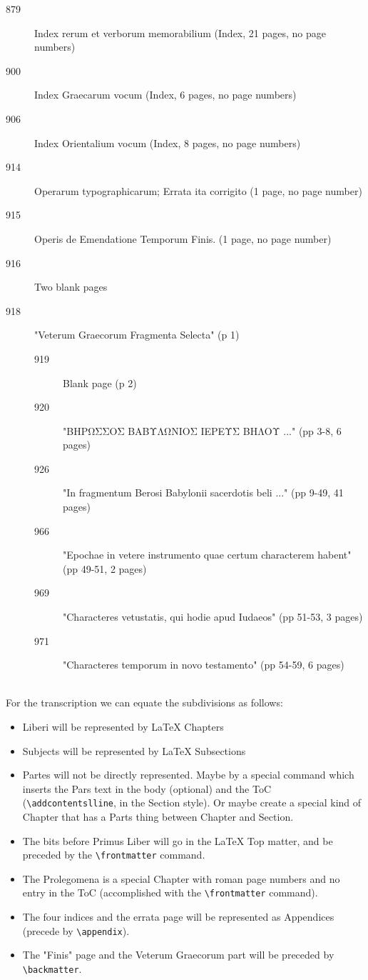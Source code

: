 \documentclass{report}
\begin{document}
\begin{description}
\item[879] Index rerum et verborum memorabilium
 (Index, 21 pages, no page numbers)
\item[900] Index Graecarum vocum (Index, 6 pages, no page numbers)
\item[906] Index Orientalium vocum (Index,  8 pages, no page numbers)
\item[914] Operarum typographicarum; Errata ita corrigito
 (1 page, no page number)
\item[915] Operis de Emendatione Temporum Finis. (1 page, no page number)
\item[916] Two blank pages
\item[918] "Veterum Graecorum Fragmenta Selecta" (p 1)
\begin{description}
  \item[919] Blank page (p 2)
  \item[920] "ΒΗΡΩΣΣΟΣ ΒΑΒΥΛΩΝΙΟΣ ΙΕΡΕΥΣ ΒΗΛΟΥ ..."
     (pp 3-8, 6 pages)
  \item[926] "In fragmentum Berosi Babylonii sacerdotis beli ..."
     (pp 9-49, 41 pages)
  \item[966] "Epochae in vetere instrumento quae certum characterem habent"
     (pp 49-51, 2 pages)
  \item[969] "Characteres vetustatis, qui hodie apud Iudaeos"
     (pp 51-53, 3 pages)
  \item[971] "Characteres temporum in novo testamento"
     (pp 54-59, 6 pages)
\end{description}
\end{description}
~
\\
For the transcription we can equate the subdivisions as follows:
\begin{itemize}
\item Liberi will be represented by LaTeX Chapters
\item Subjects will be represented by LaTeX Subsections
\item Partes will not be directly represented. Maybe by a special command
 which inserts the Pars text in the body (optional) and the ToC
 (\verb+\addcontentslline+, in the Section style). Or maybe create a special
  kind of Chapter that has a Parts thing between Chapter and Section.
\item The bits before Primus Liber will go in the LaTeX Top matter, and be
 preceded by the \verb+\frontmatter+ command.
\item The Prolegomena is a special Chapter with roman page numbers and
 no entry in the ToC (accomplished with the \verb+\frontmatter+ command).
\item The four indices and the errata page will be represented as Appendices
 (precede by \verb+\appendix+).
\item The "Finis" page and the Veterum Graecorum part will be preceded by
 \verb+\backmatter+.
\end{itemize}
\end{document}
